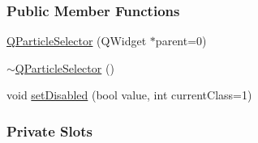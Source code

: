 \subsubsection*{Public Member Functions}
\begin{DoxyCompactItemize}
\item 
\hyperlink{class_q_particle_selector_acf2293b16d970f2e61caab8c45ece3c3}{Q\+Particle\+Selector} (Q\+Widget $\ast$parent=0)
\item 
\hyperlink{class_q_particle_selector_ae7f05ca170c3dce228229b6ccdb869ed}{$\sim$\+Q\+Particle\+Selector} ()
\item 
void \hyperlink{class_q_particle_selector_ab9401ea22f778fa8ed02577da7888897}{set\+Disabled} (bool value, int current\+Class=1)
\end{DoxyCompactItemize}
\subsubsection*{Private Slots}
